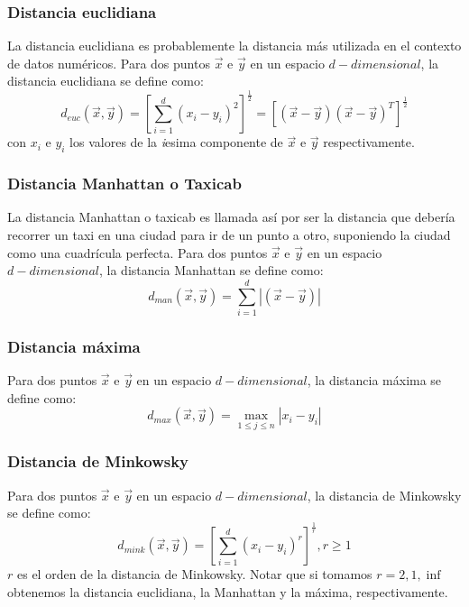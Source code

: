 \subsubsection{Distancia euclidiana}
La distancia euclidiana es probablemente la distancia más utilizada en el contexto de datos numéricos. Para dos puntos $\vec{x}$ e $\vec{y}$ en un espacio $d-dimensional$, la distancia euclidiana se define como:
\begin{equation}
	d_{euc}(\vec{x}, \vec{y}) = [\sum\limits_{i=1}^d (x_i-y_i)^2]^\frac{1}{2} = [(\vec{x}-\vec{y})(\vec{x}-\vec{y})^T]^\frac{1}{2}
\end{equation}
con $x_i$ e $y_i$ los valores de la \textit{i}esima componente de $\vec{x}$ e $\vec{y}$ respectivamente.

\subsubsection{Distancia Manhattan o Taxicab}
La distancia Manhattan o taxicab es llamada así por ser la distancia que debería recorrer un taxi en una ciudad para ir de un punto a otro, suponiendo la ciudad como una cuadrícula perfecta.
Para dos puntos $\vec{x}$ e $\vec{y}$ en un espacio $d-dimensional$, la distancia Manhattan se define como:
\begin{equation}
	d_{man}(\vec{x}, \vec{y}) = \sum\limits_{i=1}^d |(\vec{x}-\vec{y})|
\end{equation}
\subsubsection{Distancia máxima}
Para dos puntos $\vec{x}$ e $\vec{y}$ en un espacio $d-dimensional$, la distancia máxima se define como:
\begin{equation}
	d_{max}(\vec{x}, \vec{y}) = \max_{1 \leq j \leq n} |x_i-y_i|
\end{equation}
\subsubsection{Distancia de Minkowsky}
Para dos puntos $\vec{x}$ e $\vec{y}$ en un espacio $d-dimensional$, la distancia de Minkowsky se define como:
\begin{equation}
	d_{mink}(\vec{x}, \vec{y}) = [\sum\limits_{i=1}^d (x_i-y_i)^r]^\frac{1}{r}, r \geq 1
\end{equation}
$r$ es el orden de la distancia de Minkowsky. Notar que si tomamos $r = 2,1,\inf$ obtenemos la distancia euclidiana, la Manhattan y la máxima, respectivamente.
